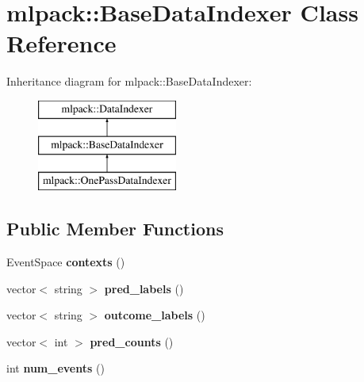 \hypertarget{classmlpack_1_1_base_data_indexer}{
\section{mlpack::BaseDataIndexer Class Reference}
\label{classmlpack_1_1_base_data_indexer}
}
Inheritance diagram for mlpack::BaseDataIndexer:\begin{figure}[H]
\begin{center}
\leavevmode
\includegraphics[height=3.000000cm]{classmlpack_1_1_base_data_indexer}
\end{center}
\end{figure}
\subsection*{Public Member Functions}
\begin{DoxyCompactItemize}
\item 
\hypertarget{classmlpack_1_1_base_data_indexer_a6542ba9420fbf16b258f533ad7feeafb}{
EventSpace {\bfseries contexts} ()}
\label{classmlpack_1_1_base_data_indexer_a6542ba9420fbf16b258f533ad7feeafb}

\item 
\hypertarget{classmlpack_1_1_base_data_indexer_a68b3500567d2ce7454da5ab64f80ff41}{
vector$<$ string $>$ {\bfseries pred\_\-labels} ()}
\label{classmlpack_1_1_base_data_indexer_a68b3500567d2ce7454da5ab64f80ff41}

\item 
\hypertarget{classmlpack_1_1_base_data_indexer_a82868b102570634a7b352f8d2b94b46e}{
vector$<$ string $>$ {\bfseries outcome\_\-labels} ()}
\label{classmlpack_1_1_base_data_indexer_a82868b102570634a7b352f8d2b94b46e}

\item 
\hypertarget{classmlpack_1_1_base_data_indexer_a968875f8d7cd612ff458f331cc263b8e}{
vector$<$ int $>$ {\bfseries pred\_\-counts} ()}
\label{classmlpack_1_1_base_data_indexer_a968875f8d7cd612ff458f331cc263b8e}

\item 
\hypertarget{classmlpack_1_1_base_data_indexer_a359a04d8614a211c06e4bfd4b752a027}{
int {\bfseries num\_\-events} ()}
\label{classmlpack_1_1_base_data_indexer_a359a04d8614a211c06e4bfd4b752a027}

\end{DoxyCompactItemize}

